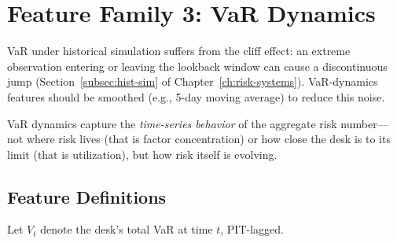 \section{Feature Family 3: VaR Dynamics}
\label{sec:feat-var-dynamics}

\begin{prereq}
VaR under historical simulation suffers from the cliff effect: an
extreme observation entering or leaving the lookback window can cause
a discontinuous jump (Section~\ref{subsec:hist-sim} of
Chapter~\ref{ch:risk-systems}).  VaR-dynamics features should be
smoothed (e.g., 5-day moving average) to reduce this noise.
\end{prereq}

VaR dynamics capture the \emph{time-series behavior} of the aggregate
risk number---not where risk lives (that is factor concentration) or
how close the desk is to its limit (that is utilization), but how risk
itself is evolving.

\subsection{Feature Definitions}

Let $V_t$ denote the desk's total VaR at time $t$, PIT-lagged.

